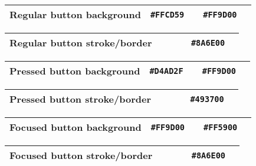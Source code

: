 \begin{table}[!htbp]
	\begin{tabularx}{\textwidth}{X r c r c}
		Regular button background 
		& \texttt{\#FFCD59} & \cellcolor[HTML]{FFCD59}\phantom{--}
		& \texttt{\#FF9D00} & \cellcolor[HTML]{FF9D00}\phantom{--} \\ \hline
	\end{tabularx}
\end{table}

\begin{table}[!htbp]
	\begin{tabularx}{\textwidth}{X r c r c}
		Regular button stroke/border 
		& ~ & ~
		& \texttt{\#8A6E00} & \cellcolor[HTML]{8A6E00}\phantom{--} \\ \hline
	\end{tabularx}
\end{table}

\begin{table}[!htbp]
	\begin{tabularx}{\textwidth}{X r c r c}
		Pressed button background 
		& \texttt{\#D4AD2F} & \cellcolor[HTML]{D4AD2F}\phantom{--}
		& \texttt{\#FF9D00} & \cellcolor[HTML]{FF9D00}\phantom{--} \\ \hline
	\end{tabularx}
\end{table}

\begin{table}[!htbp]
	\begin{tabularx}{\textwidth}{X r c r c}
		Pressed button stroke/border 
		& ~ & ~
		& \texttt{\#493700} & \cellcolor[HTML]{493700}\phantom{--} \\ \hline
	\end{tabularx}
\end{table}

\begin{table}[!htbp]
	\begin{tabularx}{\textwidth}{X r c r c}
		Focused button background 
		& \texttt{\#FF9D00} & \cellcolor[HTML]{FF9D00}\phantom{--}
		& \texttt{\#FF5900} & \cellcolor[HTML]{FF5900}\phantom{--} \\ \hline
	\end{tabularx}
\end{table}

\begin{table}[!htbp]
	\begin{tabularx}{\textwidth}{X r c r c}
		Focused button stroke/border 
		& ~ & ~
		& \texttt{\#8A6E00} & \cellcolor[HTML]{8A6E00}\phantom{--} \\ \hline
	\end{tabularx}
\end{table}

